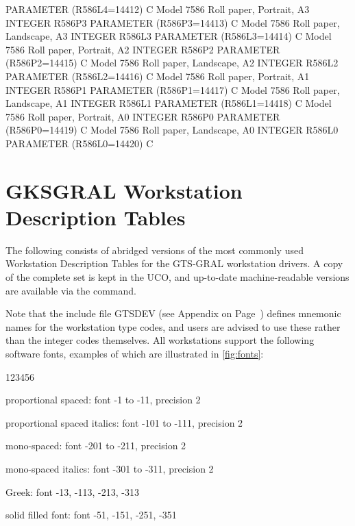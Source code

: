 \begin{XMP}
      PARAMETER (R586L4=14412)
C     Model      7586 Roll paper, Portrait,   A3
      INTEGER    R586P3
      PARAMETER (R586P3=14413)
C     Model      7586 Roll paper, Landscape,  A3
      INTEGER    R586L3
      PARAMETER (R586L3=14414)
C     Model      7586 Roll paper, Portrait,   A2
      INTEGER    R586P2
      PARAMETER (R586P2=14415)
C     Model      7586 Roll paper, Landscape,  A2
      INTEGER    R586L2
      PARAMETER (R586L2=14416)
C     Model      7586 Roll paper, Portrait,   A1
      INTEGER    R586P1
      PARAMETER (R586P1=14417)
C     Model      7586 Roll paper, Landscape,  A1
      INTEGER    R586L1
      PARAMETER (R586L1=14418)
C     Model      7586 Roll paper, Portrait,   A0
      INTEGER    R586P0
      PARAMETER (R586P0=14419)
C     Model      7586 Roll paper, Landscape,  A0
      INTEGER    R586L0
      PARAMETER (R586L0=14420)
C
\end{XMP}
\chapter{\protect\label{sec:wdtref}GKSGRAL Workstation Description Tables}
 
The following consists of abridged versions of the most commonly used
Workstation Description Tables for the GTS-GRAL workstation drivers.
A copy of the complete set is kept in the UCO, and up-to-date
machine-readable versions are available via the  command.
 
Note that the include file GTSDEV (see Appendix on Page~\pageref{sec:gtstyp})
defines mnemonic names for the workstation type codes, and users are
advised to use these rather than the integer codes themselves.
All workstations support the following software fonts,
examples of which are illustrated in \ref{fig:fonts}:
\begin{DLtt}{123456}
\item[proportional spaced:]font -1 to -11, precision 2
\item[proportional spaced italics:]font -101 to -111, precision 2
\item[mono-spaced:]font -201 to -211, precision 2
\item[mono-spaced italics:]font -301 to -311, precision 2
\item[Greek:]font -13, -113, -213, -313
\item[solid filled font:]font -51, -151, -251, -351
\end{DLtt}
 
